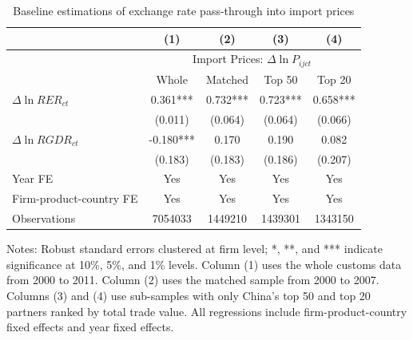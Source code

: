 \begin{table}[H]
	\centering
	\caption{Baseline estimations of exchange rate pass-through into import prices}
	\begin{threeparttable}
		\begin{tabular}{lcccc}
			\toprule
			& (1)   & (2)   & (3)   & (4) \\
			\midrule
			& \multicolumn{4}{c}{Import Prices: $\Delta \ln P_{ijct}$} \\
			& Whole & Matched & Top 50 & Top 20 \\
			\midrule
			$\Delta \ln RER_{ct}$ & 0.361*** & 0.732*** & 0.723*** & 0.658*** \\
			& (0.011) & (0.064) & (0.064) & (0.066) \\
			$\Delta \ln RGDR_{ct}$ & -0.180*** & 0.170 & 0.190 & 0.082 \\
			& (0.183) & (0.183) & (0.186) & (0.207) \\
                \midrule
			Year FE  & Yes   & Yes   & Yes   & Yes \\
			Firm-product-country FE & Yes   & Yes   & Yes   & Yes \\
			Observations & 7054033 & 1449210 & 1439301 & 1343150 \\
			\bottomrule
		\end{tabular}
		\begin{tablenotes}
			\footnotesize
			\item Notes: Robust standard errors clustered at firm level;  *, **, and *** indicate significance at 10\%, 5\%, and 1\% levels. Column (1) uses the whole customs data from 2000 to 2011. Column (2) uses the matched sample from 2000 to 2007. Columns (3) and (4) use sub-samples with only China's top 50 and top 20 partners ranked by total trade value. All regressions include firm-product-country fixed effects and year fixed effects. 
		\end{tablenotes}
	\end{threeparttable}
	\label{tab.baseline}
\end{table}

